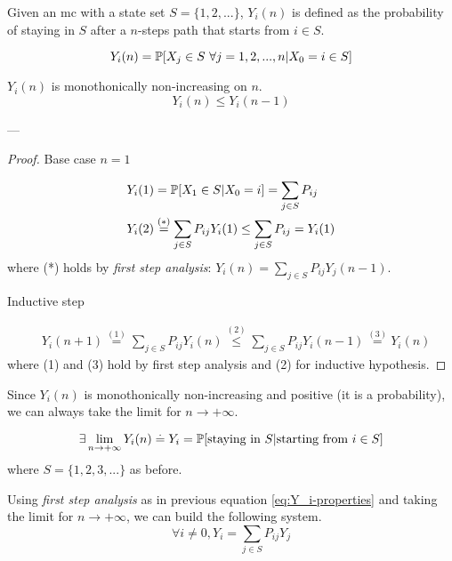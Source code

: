	\begin{definition}[$Y_i(n)$]
		Given an \gls{mc} with a state set $S = \{1, 2, ...\}$, $Y_i(n)$ is defined as the probability of staying in $S$ after a $n$-steps path that starts from $i \in S$.

		$$ Y_i(n) = \mathbb{P}[X_j \in S ~\forall j=1, 2, ..., n | X_0 = i \in S] $$
	\end{definition}

	\begin{theorem}
		$Y_i(n)$ is monothonically non-increasing on $n$.
		$$ Y_i(n) \le Y_i(n-1) $$
	\end{theorem}
	---
	\begin{proof}
		\proofpart Base case $n=1$

		\begin{equation}\begin{split} \label{eq:Y_i-properties}
			& Y_i(1) = \mathbb{P}[X_1 \in S | X_0 = i] = \sum_{j \in S} P_{ij} \\
			& Y_i(2) \stackrel{(*)}{=} \sum_{j \in S} P_{ij} Y_i(1) \le \sum_{j \in S} P_{ij} = Y_i(1)
		\end{split}\end{equation}
		where (*) holds by \emph{first step analysis}: $ Y_i(n) = \sum_{j \in S} P_{ij} Y_j(n-1) $.

		\proofpart Inductive step

		\begin{equation}\begin{split}
			& Y_i(n+1) \stackrel{(1)}{=} \sum_{j \in S} P_{ij} Y_i(n) \stackrel{(2)}{\le} \sum_{j \in S} P_{ij} Y_i(n-1) \stackrel{(3)}{=} Y_i(n)
		\end{split}\end{equation}
		where (1) and (3) hold by first step analysis and (2) for inductive hypothesis.
	\end{proof}

	\begin{lemma}
		Since $Y_i(n)$ is monothonically non-increasing and positive (it is a probability), we can always take the limit for $n \to +\infty$.

		$$ \exists \lim_{n \to +\infty} Y_i(n) \stackrel{.}{=} Y_i = \mathbb{P}[\text{staying in } S | \text{starting from } i \in S] $$
		where $ S = \{ 1, 2, 3, ...\} $ as before.

		Using \emph{first step analysis} as in previous equation \ref{eq:Y_i-properties} and taking the limit for $n \to +\infty $, we can build the following system.
		\begin{equation} \label{eq:Yj_system}
			\forall i \neq 0, Y_i = \sum_{j \in S} P_{ij} Y_j
		\end{equation}
	\end{lemma}

